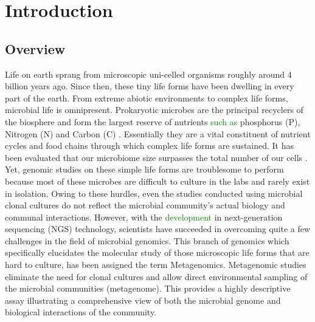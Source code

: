 \chapter{Introduction}
 \setcounter{page}{1}

\section{Overview}
Life on earth sprang from microscopic uni-celled organisms roughly around 4 billion years ago. Since then, these tiny life forms have been dwelling in every part of the earth. From extreme abiotic environments to complex life forms, microbial life is omnipresent. Prokaryotic microbes are the principal recyclers of the biosphere and form the largest reserve of nutrients \textcolor{green}{such as} phosphorus (P), Nitrogen (N) and Carbon (C) \cite{ref1}. Essentially they are a vital constituent of nutrient cycles and food chains through which complex life forms are sustained. It has been evaluated that our microbiome size surpasses the total number of our cells \cite{ref2}. Yet, genomic studies on these simple life forms are troublesome to perform because most of these microbes are difficult to culture in the labs and rarely exist in isolation. Owing to these hurdles, even the studies conducted using microbial clonal cultures do not reflect the microbial community's actual biology and communal interactions. However, with the \textcolor{green}{development} in next-generation sequencing (NGS) technology, scientists have succeeded in overcoming quite a few challenges in the field of microbial genomics. This branch of genomics which specifically elucidates the molecular study of those microscopic life forms that are hard to culture, has been assigned the term Metagenomics. Metagenomic studies eliminate the need for clonal cultures and allow direct environmental sampling of the microbial communities (metagenome). This provides a highly descriptive assay illustrating a comprehensive view of both the microbial genome and biological interactions of the community.

